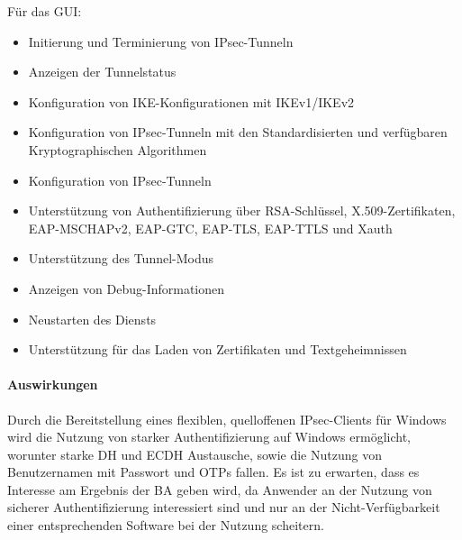 \documentclass[a4paper]{article}
\begin{document}
Für das \ac{GUI}:
\begin{itemize}
\item Initierung und Terminierung von IPsec-Tunneln
\item Anzeigen der Tunnelstatus
\item Konfiguration von IKE-Konfigurationen mit IKEv1/IKEv2
\item Konfiguration von IPsec-Tunneln mit den Standardisierten und verfügbaren Kryptographischen Algorithmen
\item Konfiguration von IPsec-Tunneln 
\item Unterstützung von Authentifizierung über RSA-Schlüssel, X.509-Zertifikaten, 
EAP-MSCHAPv2, EAP-GTC, EAP-TLS, EAP-TTLS und Xauth
\item Unterstützung des Tunnel-Modus
\item Anzeigen von Debug-Informationen
\item Neustarten des Diensts
\item Unterstützung für das Laden von Zertifikaten und Textgeheimnissen
\end{itemize}

\paragraph{Auswirkungen}
Durch die Bereitstellung eines flexiblen, quelloffenen IPsec-Clients für Windows
wird die Nutzung von starker Authentifizierung auf Windows ermöglicht, worunter
starke \ac{DH} und ECDH Austausche, sowie die Nutzung von Benutzernamen mit Passwort und \acp{OTP}
fallen.
Es ist zu erwarten, dass es Interesse am Ergebnis der \ac{BA} geben wird, da
Anwender an der Nutzung von sicherer Authentifizierung interessiert sind
und nur an der Nicht-Verfügbarkeit einer entsprechenden Software bei der Nutzung 
scheitern.
\end{document}
